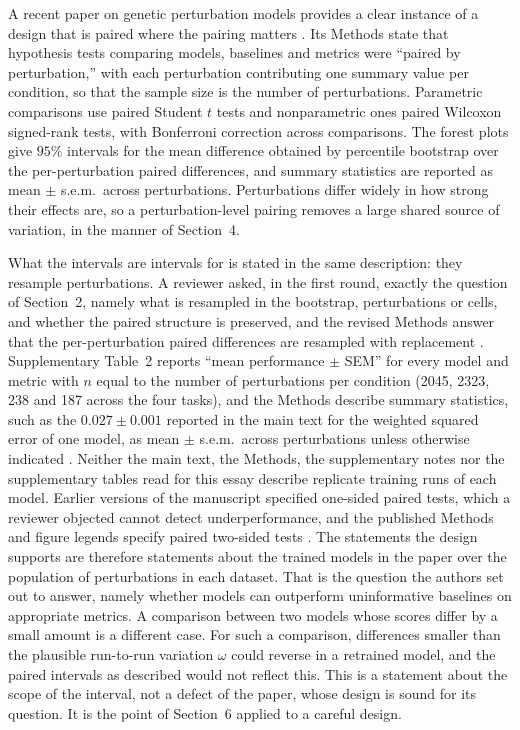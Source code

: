 \documentclass[11pt]{article}
\theoremstyle{definition}
\begin{document}
A recent paper on genetic perturbation models provides a clear instance of a design that is paired where the pairing matters \citep{miller2026}. Its Methods state that hypothesis tests comparing models, baselines and metrics were ``paired by perturbation,'' with each perturbation contributing one summary value per condition, so that the sample size is the number of perturbations. Parametric comparisons use paired Student $t$ tests and nonparametric ones paired Wilcoxon signed-rank tests, with Bonferroni correction across comparisons. The forest plots give $95\%$ intervals for the mean difference obtained by percentile bootstrap over the per-perturbation paired differences, and summary statistics are reported as mean $\pm$ s.e.m.\ across perturbations. Perturbations differ widely in how strong their effects are, so a perturbation-level pairing removes a large shared source of variation, in the manner of Section~4.

What the intervals are intervals for is stated in the same description: they resample perturbations. A reviewer asked, in the first round, exactly the question of Section~2, namely what is resampled in the bootstrap, perturbations or cells, and whether the paired structure is preserved, and the revised Methods answer that the per-perturbation paired differences are resampled with replacement \citep{miller2026peer}. Supplementary Table~2 reports ``mean performance $\pm$ SEM'' for every model and metric with $n$ equal to the number of perturbations per condition (2045, 2323, 238 and 187 across the four tasks), and the Methods describe summary statistics, such as the $0.027\pm0.001$ reported in the main text for the weighted squared error of one model, as mean $\pm$ s.e.m.\ across perturbations unless otherwise indicated \citep{miller2026supp}. Neither the main text, the Methods, the supplementary notes nor the supplementary tables read for this essay describe replicate training runs of each model. Earlier versions of the manuscript specified one-sided paired tests, which a reviewer objected cannot detect underperformance, and the published Methods and figure legends specify paired two-sided tests \citep{miller2026peer}. The statements the design supports are therefore statements about the trained models in the paper over the population of perturbations in each dataset. That is the question the authors set out to answer, namely whether models can outperform uninformative baselines on appropriate metrics. A comparison between two models whose scores differ by a small amount is a different case. For such a comparison, differences smaller than the plausible run-to-run variation $\omega$ could reverse in a retrained model, and the paired intervals as described would not reflect this. This is a statement about the scope of the interval, not a defect of the paper, whose design is sound for its question. It is the point of Section~6 applied to a careful design.
\end{document}
